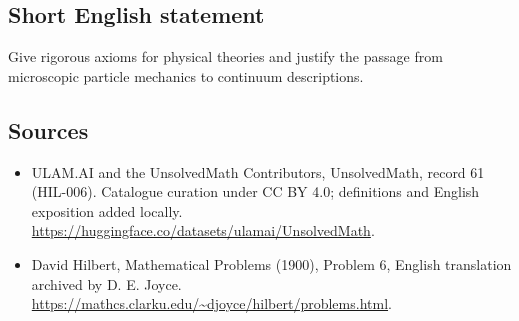 \documentclass[11pt]{article}
\begin{document}
\subsection{Short English statement}
Give rigorous axioms for physical theories and justify the passage from microscopic particle mechanics to continuum descriptions.
\subsection{Sources}
\begin{itemize}
\item[\hypertarget{source:61:1}{S1}] ULAM.AI and the UnsolvedMath Contributors, UnsolvedMath, record 61 (HIL-006). Catalogue curation under CC BY 4.0; definitions and English exposition added locally.
\url{https://huggingface.co/datasets/ulamai/UnsolvedMath}.
\item[\hypertarget{source:61:2}{S2}] David Hilbert, Mathematical Problems (1900), Problem 6, English translation archived by D. E. Joyce.
\url{https://mathcs.clarku.edu/~djoyce/hilbert/problems.html}.
\end{itemize}
\label{end:61}
\end{document}
